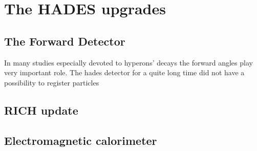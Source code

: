 \section{The HADES upgrades}

\subsection{The Forward Detector}
\label{subsec:FwDet}
In many studies especially devoted to hyperons' decays the forward angles play very important role. The hades detector for a quite long time did not have a possibility to register particles 
\subsection{RICH update}

\subsection{Electromagnetic calorimeter}

\label{chapter:HADES_upgrades}
